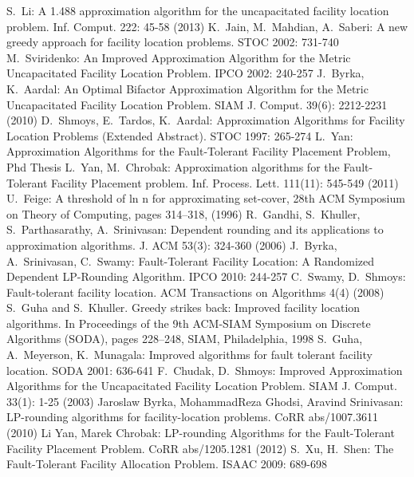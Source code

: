 \documentclass{llncs}
\begin{document}
\begin{thebibliography}{99}
 S.~Li: A 1.488 approximation algorithm for the uncapacitated facility location problem. Inf. Comput. 222: 45-58 (2013)
 K.~Jain, M.~Mahdian, A.~Saberi: A new greedy approach for facility location problems. STOC 2002: 731-740
 M.~Sviridenko: An Improved Approximation Algorithm for the Metric Uncapacitated Facility Location Problem. IPCO 2002: 240-257
 J.~Byrka, K.~Aardal: An Optimal Bifactor Approximation Algorithm for the Metric Uncapacitated Facility Location Problem. SIAM J. Comput. 39(6): 2212-2231 (2010)
 D.~Shmoys, E.~Tardos, K.~Aardal: Approximation Algorithms for Facility Location Problems (Extended Abstract). STOC 1997: 265-274
 L.~Yan: Approximation Algorithms for the Fault-Tolerant Facility Placement Problem, Phd Thesis
 L.~Yan, M.~Chrobak: Approximation algorithms for the Fault-Tolerant Facility Placement problem. Inf. Process. Lett. 111(11): 545-549 (2011)
 U.~Feige: A threshold of ln n for approximating set-cover, 28th ACM Symposium on Theory of Computing, pages 314–318, (1996)
 R.~Gandhi, S.~Khuller, S.~Parthasarathy, A.~Srinivasan: Dependent rounding and its applications to approximation algorithms. J. ACM 53(3): 324-360 (2006)
 J.~Byrka, A.~Srinivasan, C.~Swamy: Fault-Tolerant Facility Location: A Randomized Dependent LP-Rounding Algorithm. IPCO 2010: 244-257
 C.~Swamy, D.~Shmoys: Fault-tolerant facility location. ACM Transactions on Algorithms 4(4) (2008)
 S.~Guha and S.~Khuller. Greedy strikes back: Improved facility location algorithms. In Proceedings of the 9th ACM-SIAM Symposium on Discrete Algorithms (SODA), pages 228–248, SIAM, Philadelphia, 1998
 S.~Guha, A.~Meyerson, K.~Munagala: Improved algorithms for fault tolerant facility location. SODA 2001: 636-641
 F.~Chudak, D.~Shmoys: Improved Approximation Algorithms for the Uncapacitated Facility Location Problem. SIAM J. Comput. 33(1): 1-25 (2003)
 Jaroslaw Byrka, MohammadReza Ghodsi, Aravind Srinivasan: LP-rounding algorithms for facility-location problems. CoRR abs/1007.3611 (2010)
 Li Yan, Marek Chrobak: LP-rounding Algorithms for the Fault-Tolerant Facility Placement Problem. CoRR abs/1205.1281 (2012)
 S.~Xu, H.~Shen: The Fault-Tolerant Facility Allocation Problem. ISAAC 2009: 689-698
\end{thebibliography}
\end{document}
